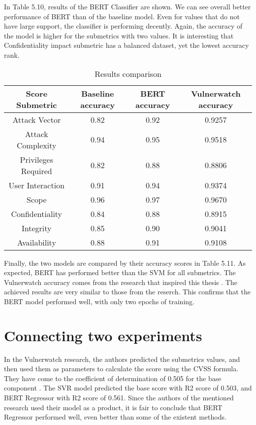 \documentclass[times, utf8, zavrsni, english]{fer}
\begin{document}
\noindent In Table 5.10, results of the BERT Classifier are shown.
We can see overall better performance of BERT than of the baseline model.
Even for values that do not have large support, the classifier is performing decently. 
Again, the accuracy of the model is higher for the submetrics with two values.
It is interesting that Confidentiality impact submetric has a balanced dataset, yet the lowest accuracy rank.

\begin{table}[h!]
	\centering
	\begin{tabular}{| c | c | c | c|} 
		\hline
		Score Submetric & Baseline accuracy & BERT accuracy & Vulnerwatch accuracy \\ [0.5ex] 
		\hline\hline
		Attack Vector & 0.82 & 0.92 & 0.9257\\
		\hline
		Attack Complexity & 0.94 & 0.95 & 0.9518 \\
		\hline
		Privileges Required & 0.82 & 0.88 & 0.8806 \\
		\hline
		User Interaction & 0.91 & 0.94 & 0.9374\\
		\hline
		Scope & 0.96 & 0.97 & 0.9670 \\
		\hline
		Confidentiality & 0.84 & 0.88 & 0.8915\\
		\hline
		Integrity & 0.85 & 0.90 & 0.9041\\
		\hline
		Availability & 0.88 & 0.91 & 0.9108 \\
		\hline
		
	\end{tabular}
	\caption{Results comparison}
	\label{table:13}
\end{table}
 \clearpage
\noindent Finally, the two models are compared by their accuracy scores in Table 5.11.
As expected, BERT has performed better than the SVM for all submetrics.
The Vulnerwatch accuracy comes from the research that inspired this thesis \citep{vulnerwatch}. The achieved results are very similar to those from the reserch. This confirms that the BERT model performed well, with only two epochs of training.

\section{Connecting two experiments}
In the Vulnerwatch research, the authors predicted the submetrics values, and then used them as parameters to calculate the score using the CVSS formula. They have come to the coefficient of determination of 0.505 for the base component \citep{vulnerwatch}.
The SVR model predicted the base score with R2 score of 0.503, and BERT Regressor with R2 score of 0.561.
Since the authors of the mentioned research used their model as a product, it is fair to conclude that BERT Regressor performed well, even better than some of the existent methods.
\end{document}
